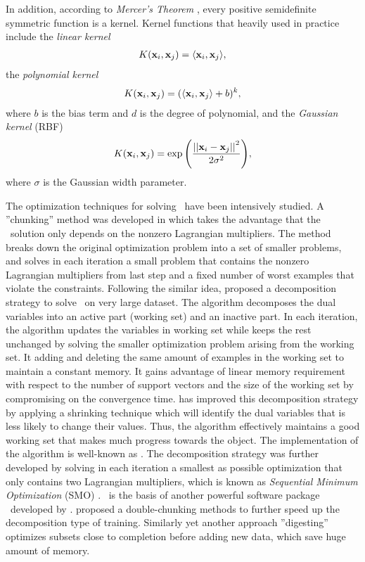 In addition, according to \textit{Mercer's Theorem} \citep{taylor04}, every positive semidefinite symmetric function is a kernel.
Kernel functions that heavily used in practice include the \textit{linear kernel}
\begin{align*}
	K(\mathbf {x}_i,\mathbf {x}_j) = \langle \mathbf {x}_i, \mathbf {x}_j \rangle,
\end{align*}
the \textit{polynomial kernel}
\begin{align*}
	K(\mathbf {x}_i,\mathbf {x}_j) = (\langle \mathbf {x}_i, \mathbf {x}_j \rangle + b)^k,
\end{align*}
where $b$ is the bias term and $d$ is the degree of polynomial, and the \textit{Gaussian kernel} (RBF)
\begin{align*}
	K(\mathbf {x}_i,\mathbf {x}_j) = \exp{\left(\frac{\left|\left| {\mathbf {x}_i}-{\mathbf {x}_j} \right|\right|^2}{2\sigma^2}\right)},
\end{align*}
where $\sigma$ is the Gaussian width parameter.

The optimization techniques for solving \svm\ have been intensively studied.
A ''chunking'' method was developed in \citep{Vapnik82estimation} which takes the advantage that the \svm\ solution only depends on the nonzero Lagrangian multipliers.
The method breaks down the original optimization problem into a set of smaller problems, and solves in each iteration a small problem that contains the nonzero Lagrangian multipliers from last step and a fixed number of worst examples that violate the constraints.
Following the similar idea, \citet{Osuna97an} proposed a decomposition strategy to solve \svm\ on very large dataset.
The algorithm decomposes the dual variables into an active part (working set) and an inactive part.
In each iteration, the algorithm updates the variables in working set while keeps the rest unchanged by solving the smaller optimization problem arising from the working set.
It adding and deleting the same amount of examples in the working set to maintain a constant memory.
It gains advantage of linear memory requirement with respect to the number of support vectors and the size of the working set by compromising on the convergence time.
\citep{Joachims98making} has improved this decomposition strategy by applying a shrinking technique which will identify the dual variables that is less likely to change their values.
Thus, the algorithm effectively maintains a good working set that makes much progress towards the object.
The implementation of the algorithm is well-known as \svmlight.
The decomposition strategy was further developed by solving in each iteration a smallest as possible optimization that only contains two Lagrangian multipliers, which is known as \textit{Sequential Minimum Optimization} (SMO) \citep{Platt98sequential,Platt99fast}.
\smo\ is the basis of another powerful software package \libsvm\ developed by \citet{Chang11libsvm}.
\citet{Perezcruz04double} proposed a double-chunking methods to further speed up the decomposition type of training. 
Similarly yet another approach ''digesting'' \citep{Decoste02support} optimizes subsets close to completion before adding new data, which save huge amount of memory.

